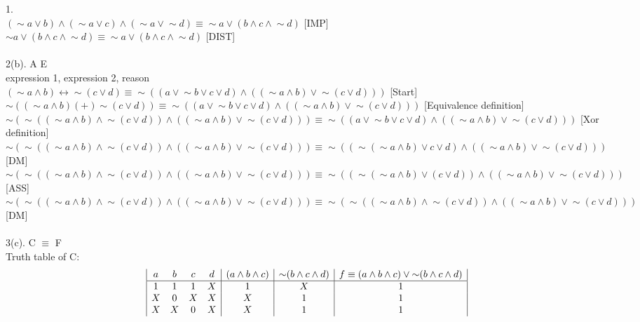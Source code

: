 \documentclass[a4paper, 20pt]{article}
\def\lnot{\mathop{\sim}}
\def\iff{\mathop{\leftrightarrow}}
\begin{document}
\begin{question}{1.}
\\$(\lnot a \lor b)\land(\lnot a \lor c)\land(\lnot a \lor \lnot d) \equiv \lnot a \lor (b \land c \land \lnot d)$ [IMP]
\\$\lnot a \lor (b \land c \land \lnot d) \equiv \lnot a \lor (b \land c \land \lnot d)$ [DIST]
\\
\\2(b). A \equiv E
\\ expression 1, expression 2, reason
\\$ (\lnot a \land b) \iff \lnot(c \lor d) \equiv \lnot ((a \lor \lnot b \lor c \lor d) \land ((\lnot a \land b) \lor \lnot (c \lor d)))$ [Start]
\\$ \lnot ((\lnot a \land b) (+) \lnot(c \lor d)) \equiv \lnot ((a \lor \lnot b \lor c \lor d) \land ((\lnot a \land b) \lor \lnot (c \lor d)))$ [Equivalence definition]
\\$  \lnot (\lnot ((\lnot a \land b) \land \lnot (c \lor d)) \land ((\lnot a \land b) \lor \lnot (c \lor d))) \equiv \lnot ((a \lor \lnot b \lor c \lor d) \land ((\lnot a \land b) \lor \lnot (c \lor d)))$ [Xor definition]
\\$  \lnot (\lnot ((\lnot a \land b) \land \lnot (c \lor d)) \land ((\lnot a \land b) \lor \lnot (c \lor d))) \equiv \lnot ((\lnot( \lnot a \land b) \lor c \lor d) \land ((\lnot a \land b) \lor \lnot (c \lor d)))$ [DM]
\\$  \lnot (\lnot ((\lnot a \land b) \land \lnot (c \lor d)) \land ((\lnot a \land b) \lor \lnot (c \lor d))) \equiv \lnot ((\lnot( \lnot a \land b) \lor (c \lor d)) \land ((\lnot a \land b) \lor \lnot (c \lor d)))$ [ASS]
\\$  \lnot (\lnot ((\lnot a \land b) \land \lnot (c \lor d)) \land ((\lnot a \land b) \lor \lnot (c \lor d))) \equiv \lnot (\lnot(( \lnot a \land b) \land \lnot (c \lor d)) \land ((\lnot a \land b) \lor \lnot (c \lor d)))$ [DM]
\\
\\3(c). C $\equiv$ F
\\ Truth table of C:
\\
\begin{displaymath}
\begin{array}{|c c c c|c|c|c|}
a & b & c & d & (a \land b \land c)&\lnot(b \land c \land d)&f \equiv (a \land b \land c)\lor \lnot(b \land c \land d)\\
\hline 
1&1&1&X&1&X&1\\
X&0&X&X&X&1&1\\
X&X&0&X&X&1&1\\

\end{array}
\end{displaymath}
\end{question}
\end{document}
